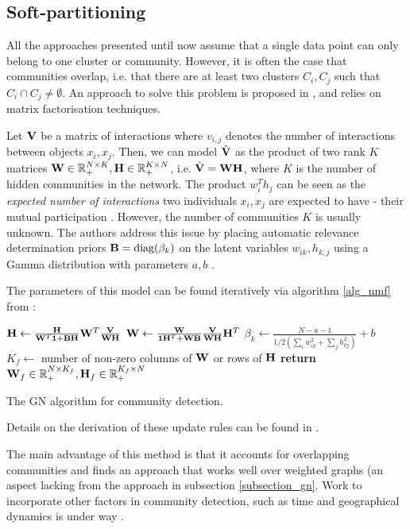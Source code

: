 \documentclass[../main.tex]{subfiles} \label{chapter_soa}
\begin{document}
\subsection{Soft-partitioning} \label{subsection_softpart}
All the approaches presented until now assume that a single data point can only belong to one cluster or community. However, it is often the case that communities overlap, i.e. that there are at least two clusters $C_i, C_j$ such that $C_i \cap C_j \neq \emptyset$. An approach to solve this problem is proposed in \cite{Psorakis2010}, and relies on matrix factorisation techniques.
\par Let $\mathbf{V}$ be a matrix of interactions where $v_{i,j}$ denotes the number of interactions between objects $x_i, x_j$. Then, we can model $\hat{\mathbf{V}}$ as the product of two rank $K$ matrices $\mathbf{W} \in \mathbb{R}_+^{N \times K}, \mathbf{H}\in \mathbb{R}_+^{K \times N}$, i.e. $\hat{\mathbf{V}} = \mathbf{WH}$, where $K$ is the number of hidden communities in the network. The product $w_i^Th_j$ can be seen as the \emph{expected number of interactions} two individuals $x_i, x_j$ are expected to have - their mutual participation \cite{Psorakis2010}. However, the number of communities $K$ is usually unknown. The authors address this issue by placing automatic relevance determination priors $\mathbf{B} = \text{diag}(\beta_k)$ on the latent variables $w_{ik}, h_{k, j}$ using a Gamma distribution with parameters $a, b$ \cite{Psorakis2010a}.
\par The parameters of this model can be found iteratively via algorithm \ref{alg_nmf} from \cite{Psorakis2010a}:
\begin{algorithm}
\begin{algorithmic}[1]
\Repeat
    \State $\mathbf{H} \gets \frac{\mathbf{H}}{\mathbf{W}^T\mathbf{1}+\mathbf{BH}}\mathbf{W}^T\mathbf{\frac{\mathbf{V}}{\mathbf{WH}}}$
    \State $\mathbf{W} \gets \frac{\mathbf{W}}{\mathbf{1}\mathbf{H}^T+\mathbf{WB}}\mathbf{\frac{\mathbf{V}}{\mathbf{WH}}}\mathbf{H}^T$
    \State $\beta_k \gets \frac{N-a-1}{1/2(\sum_i{w_{ik}^2} + \sum_j{h_{kj}^2})} + b$
$K_f \gets $ number of non-zero columns of $\mathbf{W}$ or rows of $\mathbf{H}$
\State \textbf{return} $\mathbf{W}_f \in \mathbb{R}_+^{N\times K_f}, \mathbf{H}_f\in\mathbb{R}_+^{K_f\times N}$
\EndFunction
\caption{The GN algorithm for community detection.}\label{alg_nmf}
\end{algorithmic}
\end{algorithm}
\par Details on the derivation of these update rules can be found in \cite{Psorakis2010,Psorakis2010a}. 
\par The main advantage of this method is that it accounts for overlapping communities and finds an approach that works well over weighted graphs (an aspect lacking from the approach in subsection \ref{subsection_gn}. Work to incorporate other factors in community detection, such as time and geographical dynamics is under way \cite{Psorakis2010}.
\end{document}
